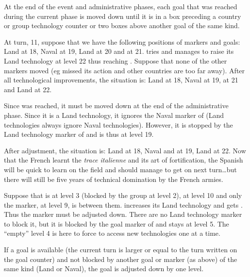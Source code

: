 \label{chExpenses:Technology:Goals Adjustment}
At the end of the event and administrative phases, each goal that was reached
during the current phase is moved down until it is in a box preceding a
country or group technology counter or two boxes above another goal of the
same kind.

\begin{exemple}
  At turn, 11, suppose that we have the following positions of markers and
  goals: Land \SPA at 18, Naval \VEN at 19, Land \FRA at 20 and \TARQ at
  21. \FRA tries and manages to raise its Land technology at level 22 thus
  reaching \TARQ. Suppose that none of the other markers moved (eg \SPA missed
  its action and other countries are too far away). After all technological
  improvements, the situation is: Land \SPA at 18, Naval \VEN at 19, \TARQ at
  21 and Land \FRA at 22.

  Since \TARQ was reached, it must be moved down at the end of the
  administrative phase. Since it is a Land technology, it ignores the Naval
  marker of \VEN (Land technologies always ignore Naval
  technologies). However, it is stopped by the Land technology marker of \SPA
  and is thus at level 19.

  After adjustment, the situation is: Land \SPA at 18, Naval \VEN and \TARQ at
  19, Land \FRA at 22. Now that the French learnt the \emph{trace italienne}
  and its art of fortification, the Spanish will be quick to learn on the
  field and should manage to get \TARQ on next turn\ldots but there will still
  be five years of technical domination by the French armies.
\end{exemple}

\begin{exemple}
  Suppose that \TREN is at level 3 (blocked by the \ROTW group at level 2),
  \TARQ at level 10 and only the \RUS marker, at level 9, is between
  them. \RUS increases its Land technology and gets \TARQ. Thus the marker
  must be adjusted down. There are no Land technology marker to block it, but
  it is blocked by the goal marker of \TREN and stays at level 5. The
  ``empty'' level 4 is here to force \ROTW to access new technologies one at a
  time.
\end{exemple}

 If a goal is available (the current turn is larger or
equal to the turn written on the goal counter) and not blocked by another goal
or marker (as above) of the same kind (Land or Naval), the goal is adjusted
down by one level.

